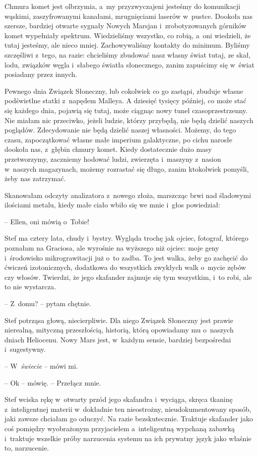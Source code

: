 \documentclass[oneside,polish,11pt,sfheadings]{mwbk}
\begin{document}
Chmura komet jest olbrzymia, a~my przyzwyczajeni jesteśmy do komunikacji
wąskimi, zaszyfrowanymi kanałami, mrugnięciami laserów w~pustce. Dookoła
nas szersze, bardziej otwarte sygnały Nowych Marsjan i~zrobotyzowanych
górników komet wypełniały spektrum. Wiedzieliśmy wszystko, co robią, a~oni wiedzieli, że tutaj jesteśmy, ale nieco mniej. Zachowywaliśmy
kontakty do minimum. Byliśmy szczęśliwi z~tego, na razie: chcieliśmy
zbudować nasz własny świat tutaj, ze skał, lodu, związków węgla i~słabego światła słonecznego, zanim zapuścimy się w~świat posiadany przez
innych.

Pewnego dnia Związek Słoneczny, lub cokolwiek co go zastąpi, zbuduje
własne podświetlne statki z~napędem Malleya. A dziesięć tysięcy później,
co może stać się każdego dnia, pojawią się tutaj, może ciągnąc nowy
tunel czasoprzestrzenny. Nie miałam nic przeciwko, jeżeli ludzie, którzy
przybędą, nie będą dzielić naszych poglądów. Zdecydowanie nie będą
dzielić naszej własności. Możemy, do tego czasu, zapoczątkować własne
małe imperium galaktyczne, po cichu narosłe dookoła nas, z~głębin chmury
komet. Kiedy dostatecznie dużo masy przetworzymy, zaczniemy hodować
ludzi, zwierzęta i~maszyny z~nasion w~naszych magazynach, możemy
rozrastać się długo, zanim ktokolwiek pomyśli, żeby nas zatrzymać.

Skanowałam odczyty analizatora z~nowego złoża, marszcząc brwi nad
śladowymi ilościami metalu, kiedy małe ciało wbiło się we mnie i~głos
powiedział: 

-- Ellen, oni mówią o~Tobie!

Stef ma cztery lata, chudy i~bystry. Wygląda trochę jak ojciec,
fotograf, którego poznałam na Graciosa, ale wyrośnie na wyższego niż
ojciec: moje geny i~środowisko mikrograwitacji już o~to zadba. To jest
walka, żeby go zachęcić do ćwiczeń izotonicznych, dodatkowa do
wszystkich zwykłych walk o~mycie zębów czy włosów. Twierdzi, że jego
skafander zajmuje się tym wszystkim, i~to robi, ale to nie wystarcza.

-- Z~domu? -- pytam chętnie.

Stef potrząsa głową, niecierpliwie. Dla niego Związek Słoneczny jest
prawie nierealną, mityczną przeszłością, historią, którą opowiadamy mu o~naszych dniach Heliocenu. Nowy Mars jest, w~każdym sensie, bardziej
bezpośredni i~sugestywny.

-- W~\textit{świecie} -- mówi mi.

-- Ok -- mówię. -- Przełącz mnie.

Stef wciska rękę w~otwarty przód jego skafandra i~wyciąga, skręca
tkaninę z~inteligentnej materii w~dokładnie ten nieostrożny,
nieudokumentowany sposób, jaki zawsze chciałam go oduczyć. Na razie
bezskutecznie. Traktuje skafander jako coś pomiędzy wyobrażonym
przyjacielem a~inteligentną wypchaną zabawką i~traktuje wszelkie próby
narzucenia systemu na ich prywatny język jako właśnie to, narzucenie.
\end{document}
